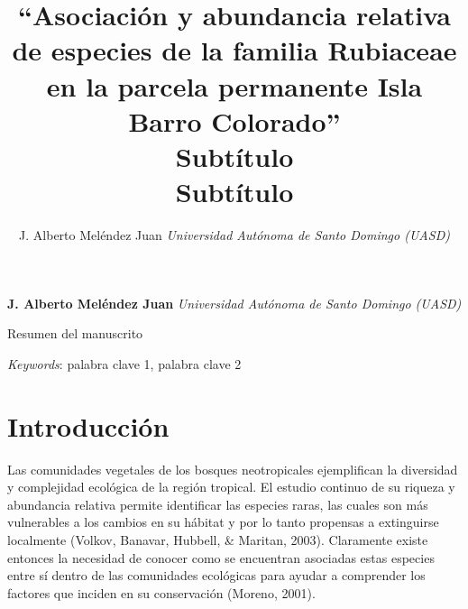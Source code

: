 \documentclass[11pt,]{article}
\title{``Asociación y abundancia relativa de especies de la familia Rubiaceae
en la parcela permanente Isla Barro Colorado''\\
Subtítulo\\
Subtítulo  }
\author{\Large J. Alberto Meléndez Juan\vspace{0.05in} \newline\normalsize\emph{Universidad Autónoma de Santo Domingo (UASD)}  }
\date{}
\newcommand*{\authorfont}{\fontfamily{phv}\selectfont}
\renewenvironment{abstract}
 {{%
    \setlength{\leftmargin}{0mm}
    \setlength{\rightmargin}{\leftmargin}%
  }%
  \relax}
 {\endlist}
\begin{document}
	
%

{%
\setlength{\parindent}{0pt}
\thispagestyle{plain}
{\fontsize{18}{20}\selectfont\raggedright 
\maketitle  %

}

{
   \vskip 13.5pt\relax \normalsize\fontsize{11}{12} 
\textbf{\authorfont J. Alberto Meléndez Juan} \hskip 15pt \emph{\small Universidad Autónoma de Santo Domingo (UASD)}   

}

}








\begin{abstract}

    \hbox{\vrule height .2pt width 39.14pc}

    \vskip 8.5pt %

\noindent Resumen del manuscrito


\vskip 8.5pt \noindent \emph{Keywords}: palabra clave 1, palabra clave 2 \par

    \hbox{\vrule height .2pt width 39.14pc}



\end{abstract}


\vskip 6.5pt


\noindent  \section{Introducción}\label{introducciuxf3n}

Las comunidades vegetales de los bosques neotropicales ejemplifican la
diversidad y complejidad ecológica de la región tropical. El estudio
continuo de su riqueza y abundancia relativa permite identificar las
especies raras, las cuales son más vulnerables a los cambios en su
hábitat y por lo tanto propensas a extinguirse localmente (Volkov,
Banavar, Hubbell, \& Maritan, 2003). Claramente existe entonces la
necesidad de conocer como se encuentran asociadas estas especies entre
sí dentro de las comunidades ecológicas para ayudar a comprender los
factores que inciden en su conservación (Moreno, 2001).
\end{document}
